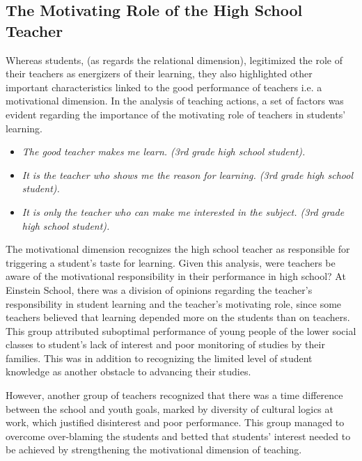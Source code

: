 \documentclass[11pt, a4paper]{article}
\begin{document}
\subsection{The Motivating Role of the High School Teacher}

Whereas students, (as regards the relational dimension), legitimized the role of their teachers as energizers of their
learning, they also highlighted other important characteristics linked to the good performance of teachers i.e. a
motivational dimension. In the analysis of teaching actions, a set of factors was evident regarding the importance of the
motivating role of teachers in students' learning.

\begin{itemize}
    \item {\it The good teacher makes me learn. (3rd grade high school student).}
    \item {\it It is the teacher who shows me the reason for learning. (3rd grade high school student).}
    \item {\it It is only the teacher who can make me interested in the subject. (3rd grade high school student).}
\end{itemize}

The motivational dimension recognizes the high school teacher as responsible for triggering a student's taste for learning.
Given this analysis, were teachers be aware of the motivational responsibility in their performance in high school? At
Einstein School, there was a division of opinions regarding the teacher's responsibility in student learning and the
teacher's motivating role, since some teachers believed that learning depended more on the students than on teachers. This
group attributed suboptimal performance of young people of the lower social classes to student's lack of interest and poor
monitoring of studies by their families. This was in addition to recognizing the limited level of student knowledge as
another obstacle to advancing their studies.

However, another group of teachers recognized that there was a time difference between the school and youth goals,
marked by diversity of cultural logics at work, which justified disinterest and poor performance. This group managed to
overcome over-blaming the students and betted that students' interest needed to be achieved by strengthening the
motivational dimension of teaching.
\end{document}
